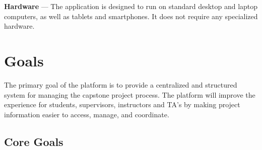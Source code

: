 \documentclass{article}
\begin{document}
\textbf{Hardware} --- The application is designed to run on standard
desktop and laptop computers, as well as tablets and smartphones. It does
not require any specialized hardware.

\section{Goals}

The primary goal of the platform is to provide a centralized and structured
system for managing the capstone project process. The platform will improve the
experience for students, supervisors, instructors and TA's by making project information
easier to access, manage, and coordinate.

\subsection{Core Goals}
\end{document}
